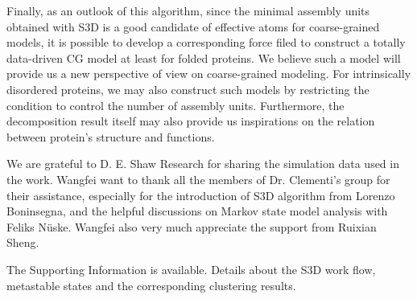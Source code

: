 \documentclass[journal=jacsat,manuscript=article]{achemso}
\begin{document}
Finally, as an outlook of this algorithm, since the minimal assembly units obtained with S3D is a good candidate of effective atoms for coarse-grained models, it is possible to develop a corresponding force filed to construct a totally data-driven CG model at least for folded proteins. We believe such a model will provide us a new perspective of view on coarse-grained modeling. For intrinsically disordered proteins, we may also construct such models by restricting the condition to control the number of assembly units. Furthermore, the decomposition result itself may also provide us inspirations on the relation between protein's structure and functions.

\begin{acknowledgement}

We are grateful to D. E. Shaw Research for sharing the simulation data used in the work.  Wangfei want to thank all the members of Dr. Clementi's group for their assistance, especially for the introduction of S3D algorithm from Lorenzo Boninsegna, and the helpful discussions on Markov state model analysis with Feliks Nüske. Wangfei also very much appreciate the support from Ruixian Sheng.

\end{acknowledgement}

\begin{suppinfo}

The Supporting Information is available. Details about the S3D work flow, metastable states and the corresponding clustering results.

\end{suppinfo}


\end{document}
